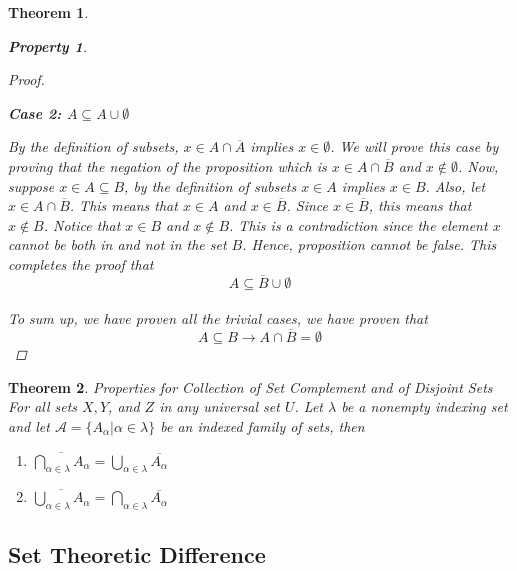 \documentclass{book}
\newtheorem{theorem}{Theorem}[section]
\newtheorem{property}{Property}[theorem]
\theoremstyle{definition}
\theoremstyle{remark}
\newcommand{\cc}[1]{\mathcal{#1}}
\begin{document}
\begin{theorem}
\begin{property}
\begin{proof}
            
            \begin{flushleft} \textbf{Case 2: $A \subseteq A \cup \emptyset$} \end{flushleft} 
                By the definition of subsets, $x \in A \cap \overline{A}$ implies $x \in \emptyset$. We will prove this case by proving that the negation of the proposition which is $x \in A \cap \overline{B}$ and $x \notin \emptyset$. Now, suppose $x \in A \subseteq B$, by the definition of subsets $x \in A$ implies $x \in B$. Also, let $x \in A \cap \overline{B}$. This means that $x \in A$ and $x \in \overline{B}$. Since $x \in \overline{B}$, this means that $x \notin B$. Notice that $x \in B$ and $x \notin B$. This is a contradiction since the element $x$ cannot be both in and not in the set $B$. Hence, proposition cannot be false. This completes the proof that $$ A \subseteq \overline{B} \cup \emptyset $$ \\
            To sum up, we have proven all the trivial cases, we have proven that $$ A \subseteq B \to A \cap \overline{B} = \emptyset $$ 
        \end{proof}
    \end{property}
\end{theorem}





\newpage
\begin{theorem}
Properties for Collection of Set Complement and of Disjoint Sets \\

For all sets $X, Y$, and $Z$ in any universal set $U$. Let $\lambda$ be a nonempty indexing set and let $\cc{A} = \{ A_{\alpha} | \alpha \in \lambda \}$ be an indexed family of sets, then 
    
    \begin{enumerate}
        \item $\overline{\bigcap_{\alpha \in \lambda}{A_{\alpha}}} = \bigcup_{\alpha \in \lambda}{ \overline{A_{\alpha}}}$
        
        \item $\overline{\bigcup_{\alpha \in \lambda}{A_{\alpha}}} = \bigcap_{\alpha \in \lambda}{ \overline{A_{\alpha}}}$
    \end{enumerate}
\end{theorem}



\newpage
\subsection{Set Theoretic Difference}
\end{document}

